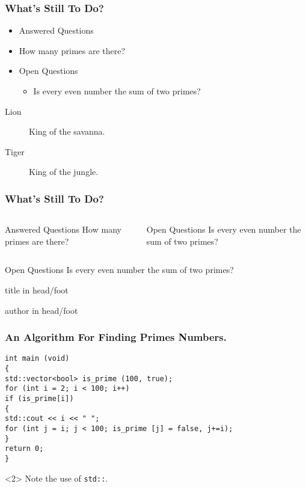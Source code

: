 \documentclass[xcolor=dvipsnames]{beamer}
\begin{document}
\begin{frame}
\frametitle{What’s Still To Do?}
\begin{itemize}
\item Answered Questions
\item How many primes are there?
\item Open Questions
\begin{itemize}
\item Is every even number the sum of two primes?
\end{itemize}
\end{itemize}
\begin{description}
\item[Lion] King of the savanna.
\item[Tiger] King of the jungle.
\end{description}
\end{frame}

\begin{frame}
\frametitle{What’s Still To Do?}
\begin{columns}
\begin{block}{Answered Questions}
How many primes are there?
\end{block}
\begin{block}{Open Questions}
Is every even number the sum of two primes?
\end{block}
\end{columns}
\begin{block}{Open Questions}
Is every even number the sum of two primes?
\cite{Goldbach1742}
\end{block}

\begin{beamercolorbox}[ht=2.5ex,dp=1ex,center]{title in head/foot}
\insertshorttitle
\end{beamercolorbox}%
\begin{beamercolorbox}[ht=2.5ex,dp=1ex,center]{author in head/foot}
\insertshortauthor
\end{beamercolorbox}
\end{frame}


\begin{frame}[fragile]
\frametitle{An Algorithm For Finding Primes Numbers.}
\begin{verbatim}
int main (void)
{
std::vector<bool> is_prime (100, true);
for (int i = 2; i < 100; i++)
if (is_prime[i])
{
std::cout << i << " ";
for (int j = i; j < 100; is_prime [j] = false, j+=i);
}
return 0;
}
\end{verbatim}
\begin{uncoverenv}<2>
Note the use of \verb|std::|.
\end{uncoverenv}
\end{frame}
\end{document}
